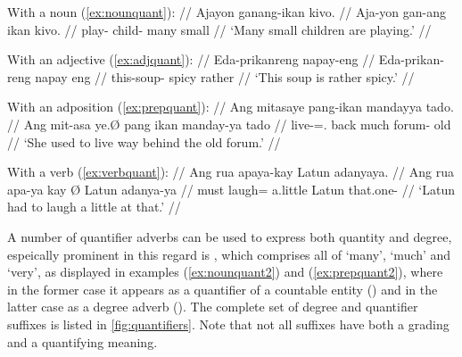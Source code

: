\pex
\a\label{ex:nounquant2}\begingl
	\glpreamble With a noun (\ref{ex:nounquant}): //
	\gla Ajayon ganang-ikan kivo. //
	\glb Aja-yon {gan-ang ikan} kivo. //
	\glc play-\TsgN{} {child-\Aarg{} many} small //
	\glft `Many small children are playing.' //
\endgl

\a\label{ex:adjquant2}\begingl
	\glpreamble With an adjective (\ref{ex:adjquant}): //
	\gla Eda-prikanreng napay-eng //
	\glb Eda-prikan-reng {napay eng} //
	\glc this-soup-\AargI{} {spicy rather} //
	\glft `This soup is rather spicy.' //
\endgl

\a\label{ex:prepquant2}\begingl
	\glpreamble With an adposition (\ref{ex:prepquant}): //
	\gla Ang mitasaye pang-ikan mandayya tado. //
	\glb Ang mit-asa ye.Ø {pang ikan} manday-ya tado //
	\glc \AgtT{} live-\Hab{}=\TsgF{}.\Top{} {back much} forum-\Loc{} old //
	\glft `She used to live way behind the old forum.' //
\endgl

\a\label{ex:verbquant2}\begingl
	\glpreamble With a verb (\ref{ex:verbquant}): //
	\gla Ang rua apaya-kay {} Latun adanyaya. //
	\glb Ang rua {apa-ya kay} Ø Latun adanya-ya //
	\glc \AgtT{} must {laugh=\TsgM{} a.little} \Top{} Latun that.one-\Loc{} //
	\glft `Latun had to laugh a little at that.' //
\endgl

\xe

A number of quantifier adverbs can be used to express both quantity and 
degree, espeically prominent in this regard is , which 
comprises all of `many', `much' and `very', as displayed in examples 
(\ref{ex:nounquant2}) and (\ref{ex:prepquant2}), where in the former case it 
appears as a quantifier of a countable entity 
() and in the latter case as a 
degree adverb (). The complete set of 
degree and quantifier suffixes is listed in \autoref{fig:quantifiers}. Note 
that not all suffixes have both a grading and a quantifying meaning.

